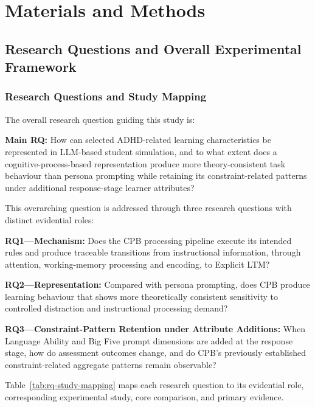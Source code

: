 \chapter{Materials and Methods} \label{Chap3}
\sloppy

\section{Research Questions and Overall Experimental Framework}
\label{sec:research-framework}

\subsection{Research Questions and Study Mapping}
\label{subsec:research-questions-mapping}

The overall research question guiding this study is:

{\scriptsize
\textbf{Main RQ:} How can selected ADHD-related learning characteristics be represented in LLM-based student simulation, and to what extent does a cognitive-process-based representation produce more theory-consistent task behaviour than persona prompting while retaining its constraint-related patterns under additional response-stage learner attributes?
\par}

This overarching question is addressed through three research questions with distinct evidential roles:

{\small
\textbf{RQ1---Mechanism:} Does the CPB processing pipeline execute its intended rules and produce traceable transitions from instructional information, through attention, working-memory processing and encoding, to Explicit LTM?

\textbf{RQ2---Representation:} Compared with persona prompting, does CPB produce learning behaviour that shows more theoretically consistent sensitivity to controlled distraction and instructional processing demand?

\textbf{RQ3---Constraint-Pattern Retention under Attribute Additions:} When Language Ability and Big Five prompt dimensions are added at the response stage, how do assessment outcomes change, and do CPB's previously established constraint-related aggregate patterns remain observable?
\par}

Table~\ref{tab:rq-study-mapping} maps each research question to its evidential role, corresponding experimental study, core comparison, and primary evidence.

